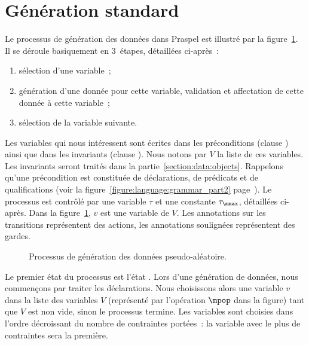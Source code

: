 \section{Génération standard}
\label{section:data:random}

Le processus de génération des données dans Praspel est illustré par la
figure~\ref{figure:data:process}. Il se déroule basiquement en 3~étapes,
détaillées ci-après~:
%
\begin{enumerate}

\item sélection d'une variable~;

\item génération d'une donnée pour cette variable, validation et affectation de
cette donnée à cette variable~;

\item sélection de la variable suivante.

\end{enumerate}

Les variables qui nous intéressent sont écrites dans les préconditions (clause
\arequires) ainsi que dans les invariants (clause \ainvariant). Nous notons par
$V$ la liste de ces variables. Les invariants seront traités dans la
partie~\ref{section:data:objects}. Rappelons qu'une précondition est constituée
de déclarations, de prédicats et de qualifications (voir la
figure~\ref{figure:language:grammar_part2}
page~\pageref{figure:language:grammar_part2}). Le processus est contrôlé par une
variable $\tau$ et une constante $\tau_{\mmax}$, détaillées ci-après.  Dans la
figure~\ref{figure:data:process}, $v$ est une variable de $V$. Les annotations
sur les transitions représentent des actions, les annotations soulignées
représentent des gardes.
%
\begin{figure}


\caption{\label{figure:data:process} Processus de génération des données
pseudo-aléatoire.}

\end{figure}

Le premier état du processus est l'état . Lors d'une génération de
données, nous commençons par traiter les déclarations. Nous choisissons alors
une variable $v$ dans la liste des variables $V$ (représenté par l'opération
$\mpop$ dans la figure) tant que $V$ est non vide, sinon le processus termine.
Les variables sont choisies dans l'ordre décroissant du nombre de contraintes
portées~: la variable avec le plus de contraintes sera la première.

